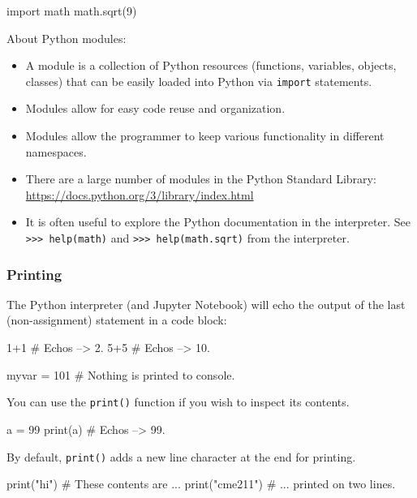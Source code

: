 \documentclass[12pt,letterpaper,twoside]{article}
\begin{document}
\begin{python}
import math
math.sqrt(9)
\end{python}

About Python modules:

\begin{itemize}
\item
  A module is a collection of Python resources (functions, variables,
  objects, classes) that can be easily loaded into Python via
  \texttt{import} statements.
\item
  Modules allow for easy code reuse and organization.
\item
  Modules allow the programmer to keep various functionality in
  different namespaces.
\item
  There are a large number of modules in the Python Standard Library:
  \url{https://docs.python.org/3/library/index.html}
\item
  It is often useful to explore the Python documentation in the
  interpreter. See \newline
  \texttt{>>> help(math)} and
  \texttt{>>> help(math.sqrt)}
  from the interpreter.
\end{itemize}

\subsubsection{Printing}

The Python interpreter (and Jupyter Notebook) 
will echo the output of the last (non-assignment)
statement in a code block:

\begin{python}
1+1  # Echos --> 2.
5+5  # Echos --> 10.
\end{python}

\begin{python}
myvar = 101  # Nothing is printed to console.
\end{python}

You can use the \texttt{print()} function if you wish to inspect its contents.
\begin{python}
a = 99
print(a)    # Echos --> 99.
\end{python}

By default, \texttt{print()} adds a new line character at the end for
printing.

\begin{python}
print("hi")           # These contents are ...
print("cme211")       # ... printed on two lines.
\end{python}
\end{document}
